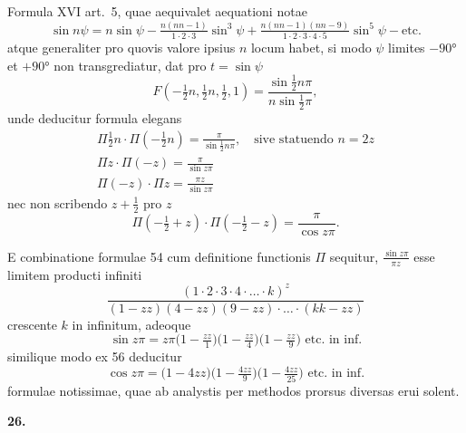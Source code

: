 \documentclass[12pt,a4paper]{article}
\newcommand{\art}[1]{\par\medskip\noindent\textbf{#1.}\par\nopagebreak\smallskip}
\begin{document}
Formula XVI art.\ 5, quae aequivalet aequationi notae
\[
\sin n\psi = n\sin\psi - \tfrac{n(nn-1)}{1\cdot2\cdot3}\sin^3\psi + \tfrac{n(nn-1)(nn-9)}{1\cdot2\cdot3\cdot4\cdot5}\sin^5\psi - \text{etc.}
\]
atque generaliter pro quovis valore ipsius $n$ locum habet, si modo $\psi$ limites $-90°$ et $+90°$ non transgrediatur, dat pro $t=\sin\psi$
\[
F(-\tfrac{1}{2}n, \tfrac{1}{2}n, \tfrac{1}{2}, 1) = \frac{\sin\frac{1}{2}n\pi}{n\sin\frac{1}{2}\pi},
\]
unde deducitur formula elegans
\begin{gather*}
\Pi\tfrac{1}{2}n\cdot\Pi(-\tfrac{1}{2}n) = \frac{\pi}{\sin\tfrac{1}{2}n\pi},\quad \text{sive statuendo } n=2z\\
\Pi z\cdot\Pi(-z) = \frac{\pi}{\sin z\pi}\tag{[54]}\\
\Pi(-z)\cdot\Pi z = \frac{\pi z}{\sin z\pi}\tag{[55]}
\end{gather*}
nec non scribendo $z+\frac{1}{2}$ pro $z$
\begin{equation}
\Pi(-\tfrac{1}{2}+z)\cdot\Pi(-\tfrac{1}{2}-z) = \frac{\pi}{\cos z\pi}.\tag{[56]}
\end{equation}

E combinatione formulae 54 cum definitione functionis $\Pi$ sequitur, $\frac{\sin z\pi}{\pi z}$ esse limitem producti infiniti
\[
\frac{(1\cdot2\cdot3\cdot4\cdot\ldots\cdot k)^z}{(1-zz)(4-zz)(9-zz)\cdot\ldots\cdot(kk-zz)}
\]
crescente $k$ in infinitum, adeoque
\[
\sin z\pi = z\pi\bigl(1-\tfrac{zz}{1}\bigr)\bigl(1-\tfrac{zz}{4}\bigr)\bigl(1-\tfrac{zz}{9}\bigr)\text{ etc.\ in inf.}
\]
similique modo ex 56 deducitur
\[
\cos z\pi = \bigl(1-4zz\bigr)\bigl(1-\tfrac{4zz}{9}\bigr)\bigl(1-\tfrac{4zz}{25}\bigr)\text{ etc.\ in inf.}
\]
formulae notissimae, quae ab analystis per methodos prorsus diversas erui solent.

\art{26}
\end{document}
